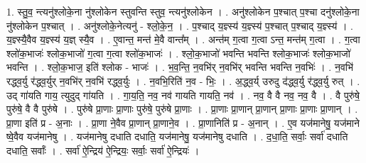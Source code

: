 \documentclass[17pt]{extarticle}
\begin{document}
1. स्तु॒व॒ न्त्यनु॑श्लोके॒ना नु॑श्लोकेन स्तुवन्ति स्तुव॒ न्त्यनु॑श्लोकेन । . अनु॑श्लोकेन प॒श्चात् प॒श्चा दनु॑श्लोके॒ना नु॑श्लोकेन प॒श्चात् । . अनु॑श्लोके॒नेत्यनु॑ - श्लो॒के॒न॒ । . प॒श्चाद् य॒ज्ञ्स्य॑ य॒ज्ञ्स्य॑ प॒श्चात् प॒श्चाद् य॒ज्ञ्स्य॑ । . य॒ज्ञ्स्यै॒वैव य॒ज्ञ्स्य॑ य॒ज्ञ् स्यै॒व । . ए॒वान्त॒ मन्त॑ मे॒वै वान्त᳚म् । . अन्त॑म् ग॒त्वा ग॒त्वा ऽन्त॒ मन्त॑म् ग॒त्वा । . ग॒त्वा श्लो॑क॒भाजः॑ श्लोक॒भाजो॑ ग॒त्वा ग॒त्वा श्लो॑क॒भाजः॑ । . श्लो॒क॒भाजो॑ भवन्ति भवन्ति श्लोक॒भाजः॑ श्लोक॒भाजो॑ भवन्ति । . श्लो॒क॒भाज॒ इति॑ श्लोक - भाजः॑ । . भ॒व॒न्ति॒ न॒वभि॑र् न॒वभि॑र् भवन्ति भवन्ति न॒वभिः॑ । . न॒वभि॑ रद्ध्व॒र्यु र॑द्ध्व॒र्युर् न॒वभि॑र् न॒वभि॑ रद्ध्व॒र्युः । . न॒वभि॒रिति॑ न॒व - भिः॒ । . अ॒द्ध्व॒र्य् उरुदु द॑द्ध्व॒र्यु र॑द्ध्व॒र्यु रुत् । . उद् गा॑यति गाय॒ त्युदुद् गा॑यति । . गा॒य॒ति॒ नव॒ नव॑ गायति गायति॒ नव॑ । . नव॒ वै वै नव॒ नव॒ वै । . वै पुरु॑षे॒ पुरु॑षे॒ वै वै पुरु॑षे । . पुरु॑षे प्रा॒णाः प्रा॒णाः पुरु॑षे॒ पुरु॑षे प्रा॒णाः । . प्रा॒णाः प्रा॒णान् प्रा॒णान् प्रा॒णाः प्रा॒णाः प्रा॒णान् । . प्रा॒णा इति॑ प्र - अ॒नाः । . प्रा॒णा ने॒वैव प्रा॒णान् प्रा॒णाने॒व । . प्रा॒णानिति॑ प्र - अ॒नान् । . ए॒व यज॑मानेषु॒ यज॑माने ष्वे॒वैव यज॑मानेषु । . यज॑मानेषु दधाति दधाति॒ यज॑मानेषु॒ यज॑मानेषु दधाति । . द॒धा॒ति॒ सर्वाः॒ सर्वा॑ दधाति दधाति॒ सर्वाः᳚ । . सर्वा॑ ऐ॒न्द्रिय॑ ऐ॒न्द्रियः॒ सर्वाः॒ सर्वा॑ ऐ॒न्द्रियः॑ । \newline
\end{document}
